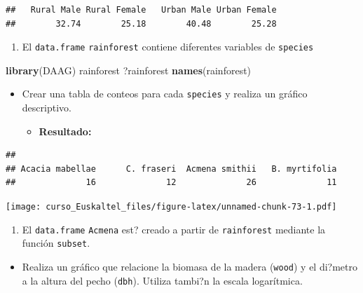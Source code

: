 \documentclass[]{book}
\newenvironment{Shaded}{\begin{snugshade}}{\end{snugshade}}
\newcommand{\KeywordTok}[1]{\textcolor[rgb]{0.13,0.29,0.53}{\textbf{#1}}}
\newcommand{\NormalTok}[1]{#1}
\providecommand{\tightlist}{%
  \setlength{\itemsep}{0pt}\setlength{\parskip}{0pt}}
\begin{document}
\begin{verbatim}
##   Rural Male Rural Female   Urban Male Urban Female 
##        32.74        25.18        40.48        25.28
\end{verbatim}

\begin{enumerate}
\def\labelenumi{\arabic{enumi}.}
\setcounter{enumi}{1}
\tightlist
\item
  El \texttt{data.frame} \texttt{rainforest} contiene diferentes
  variables de \texttt{species}
\end{enumerate}

\begin{Shaded}
\begin{Highlighting}[]
\KeywordTok{library}\NormalTok{(DAAG)}
\NormalTok{rainforest}
\NormalTok{?rainforest}
\KeywordTok{names}\NormalTok{(rainforest)}
\end{Highlighting}
\end{Shaded}

\begin{itemize}
\item
  Crear una tabla de conteos para cada \texttt{species} y realiza un
  gráfico descriptivo.

  \begin{itemize}
  \tightlist
  \item
    \textbf{Resultado:}
  \end{itemize}
\end{itemize}

\begin{verbatim}
## 
## Acacia mabellae      C. fraseri  Acmena smithii   B. myrtifolia 
##              16              12              26              11
\end{verbatim}

\texttt{[image: curso\_Euskaltel\_files/figure-latex/unnamed-chunk-73-1.pdf]}

\begin{enumerate}
\def\labelenumi{\arabic{enumi}.}
\setcounter{enumi}{2}
\tightlist
\item
  El \texttt{data.frame} \texttt{Acmena} est? creado a partir de
  \texttt{rainforest} mediante la función \texttt{subset}.
\end{enumerate}

\begin{itemize}
\tightlist
\item
  Realiza un gráfico que relacione la biomasa de la madera
  (\texttt{wood}) y el di?metro a la altura del pecho (\texttt{dbh}).
  Utiliza tambi?n la escala logarítmica.
\end{itemize}
\end{document}
